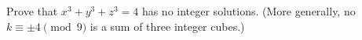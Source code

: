 Prove that $x^3+y^3+z^3=4$ has no integer solutions. (More generally, no $k\equiv\pm4\pmod9$ is a sum of three integer cubes.)
